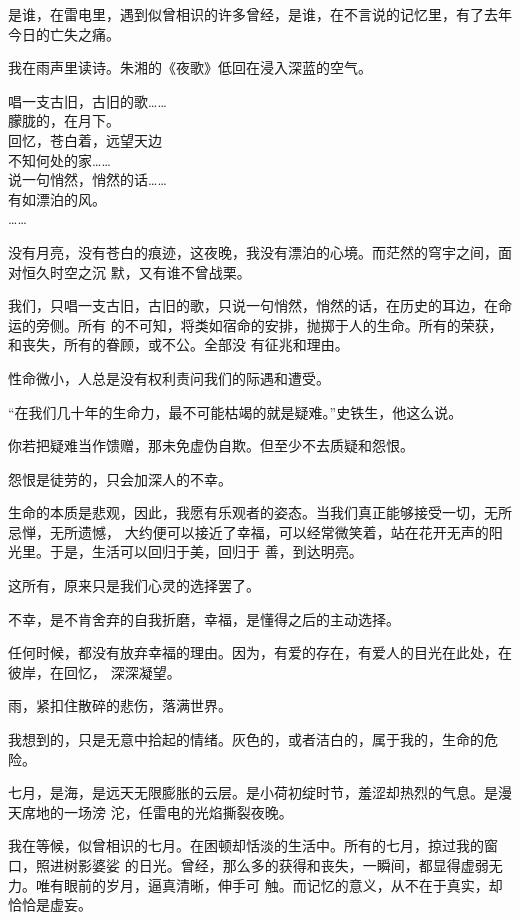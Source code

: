 		是谁，在雷电里，遇到似曾相识的许多曾经，是谁，在不言说的记忆里，有了去年今日的亡失之痛。


		我在雨声里读诗。朱湘的《夜歌》低回在浸入深蓝的空气。

		\longpoem{}{}{}
			唱一支古旧，古旧的歌…… \\
			朦胧的，在月下。\\
			回忆，苍白着，远望天边 \\
			不知何处的家…… \\
			说一句悄然，悄然的话…… \\
			有如漂泊的风。\\
			……
		\endlongpoem


		没有月亮，没有苍白的痕迹，这夜晚，我没有漂泊的心境。而茫然的穹宇之间，面对恒久时空之沉
	默，又有谁不曾战栗。


		我们，只唱一支古旧，古旧的歌，只说一句悄然，悄然的话，在历史的耳边，在命运的旁侧。所有
	的不可知，将类如宿命的安排，抛掷于人的生命。所有的荣获，和丧失，所有的眷顾，或不公。全部没
	有征兆和理由。


		性命微小，人总是没有权利责问我们的际遇和遭受。


		“在我们几十年的生命力，最不可能枯竭的就是疑难。”史铁生，他这么说。


		你若把疑难当作馈赠，那未免虚伪自欺。但至少不去质疑和怨恨。

		怨恨是徒劳的，只会加深人的不幸。


		生命的本质是悲观，因此，我愿有乐观者的姿态。当我们真正能够接受一切，无所忌惮，无所遗憾，
	大约便可以接近了幸福，可以经常微笑着，站在花开无声的阳光里。于是，生活可以回归于美，回归于
	善，到达明亮。

		这所有，原来只是我们心灵的选择罢了。

		不幸，是不肯舍弃的自我折磨，幸福，是懂得之后的主动选择。

		任何时候，都没有放弃幸福的理由。因为，有爱的存在，有爱人的目光在此处，在彼岸，在回忆，
	深深凝望。


		雨，紧扣住散碎的悲伤，落满世界。


		我想到的，只是无意中拾起的情绪。灰色的，或者洁白的，属于我的，生命的危险。

	\endwriting



		七月，是海，是远天无限膨胀的云层。是小荷初绽时节，羞涩却热烈的气息。是漫天席地的一场滂
	沱，任雷电的光焰撕裂夜晚。


		我在等候，似曾相识的七月。在困顿却恬淡的生活中。所有的七月，掠过我的窗口，照进树影婆娑
	的日光。曾经，那么多的获得和丧失，一瞬间，都显得虚弱无力。唯有眼前的岁月，逼真清晰，伸手可
	触。而记忆的意义，从不在于真实，却恰恰是虚妄。


